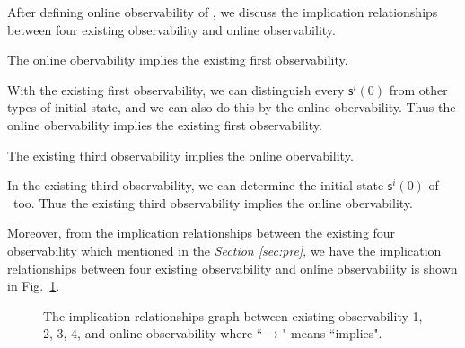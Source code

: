 After defining online observability of \BCNs, we discuss the implication relationships between four existing observability and online observability.

\begin{lemma}
The online obervability implies the existing first observability.
\label{lemm:3}
\end{lemma}

With the existing first observability, we can distinguish every $\mathsf{s}^{i}(0)$ from other types of initial state, and we can also do this by the online obervability. Thus the online obervability implies the existing first observability. 

\begin{lemma}
The existing third observability implies the online obervability.
\label{lemm:4}
\end{lemma}

In the existing third observability, we can determine the initial state $\mathsf{s}^{i}(0)$ of \BCN\ too. Thus the existing third observability implies the online obervability.

Moreover, from the implication relationships between the existing four observability which mentioned in the {\em Section \ref{sec:pre}}, we have the implication relationships between four existing observability and online observability is shown in Fig.~\ref{fig:7}.

\begin{figure}[thpb]
      \centering
      
      \caption{The implication relationships graph between existing observability 1, 2, 3, 4, and online observability where ``$\rightarrow$" means ``implies".}
      \label{fig:7}
   \end{figure}


   